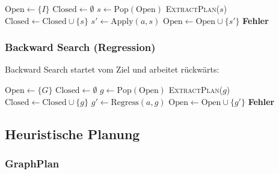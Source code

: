﻿\documentclass[a4paper,12pt]{article}
\theoremstyle{definition}
\begin{document}
\begin{algorithm}[H]
	\caption{Vorwärts-Zustandsraumsuche}
	\begin{algorithmic}[1]
		\State $\text{Open} \gets \{I\}$ 
		\State $\text{Closed} \gets \emptyset$
		\State $s \gets \text{Pop}(\text{Open})$ 
		\State \Return \textsc{ExtractPlan}($s$)
		\EndeWenn
		\State $\text{Closed} \gets \text{Closed} \cup \{s\}$
		\State $s' \gets \text{Apply}(a, s)$
		\State $\text{Open} \gets \text{Open} \cup \{s'\}$
		\EndeWenn
		\EndeFuer
		\EndeWaehrend
		\State \Return \textbf{Fehler}
		\EndProzedur
	\end{algorithmic}
\end{algorithm}

\subsubsection{Backward Search (Regression)}

Backward Search startet vom Ziel und arbeitet rückwärts:

\begin{algorithm}[H]
	\caption{Rückwärts-Regressionssuche}
	\begin{algorithmic}[1]
		\State $\text{Open} \gets \{G\}$ 
		\State $\text{Closed} \gets \emptyset$
		\State $g \gets \text{Pop}(\text{Open})$
		\State \Return \textsc{ExtractPlan}($g$)
		\EndeWenn
		\State $\text{Closed} \gets \text{Closed} \cup \{g\}$
		\State $g' \gets \text{Regress}(a, g)$ 
		\State $\text{Open} \gets \text{Open} \cup \{g'\}$
		\EndeWenn
		\EndeFuer
		\EndeWaehrend
		\State \Return \textbf{Fehler}
		\EndProzedur
	\end{algorithmic}
\end{algorithm}

\subsection{Heuristische Planung}

\subsubsection{GraphPlan}
\end{document}
